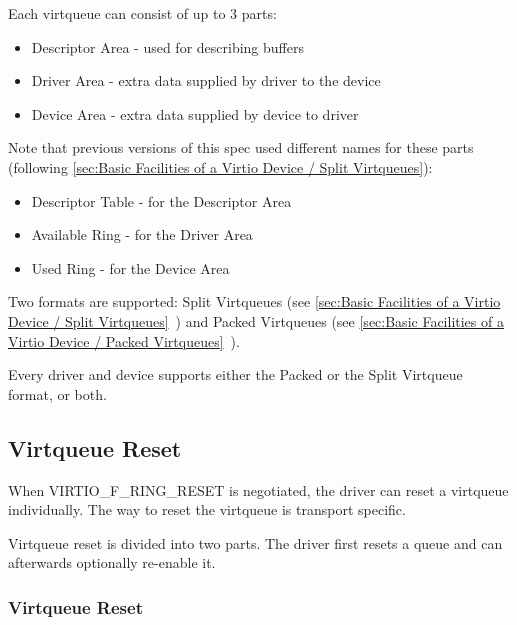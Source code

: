 Each virtqueue can consist of up to 3 parts:
\begin{itemize}
\item Descriptor Area - used for describing buffers
\item Driver Area - extra data supplied by driver to the device
\item Device Area - extra data supplied by device to driver
\end{itemize}

\begin{note}
Note that previous versions of this spec used different names for
these parts (following \ref{sec:Basic Facilities of a Virtio Device / Split Virtqueues}):
\begin{itemize}
\item Descriptor Table - for the Descriptor Area
\item Available Ring - for the Driver Area
\item Used Ring - for the Device Area
\end{itemize}

\end{note}

Two formats are supported: Split Virtqueues (see \ref{sec:Basic
Facilities of a Virtio Device / Split
Virtqueues}~) and Packed Virtqueues (see \ref{sec:Basic
Facilities of a Virtio Device / Packed
Virtqueues}~).

Every driver and device supports either the Packed or the Split
Virtqueue format, or both.

\subsection{Virtqueue Reset}\label{sec:Basic Facilities of a Virtio Device / Virtqueues / Virtqueue Reset}

When VIRTIO_F_RING_RESET is negotiated, the driver can reset a virtqueue
individually. The way to reset the virtqueue is transport specific.

Virtqueue reset is divided into two parts. The driver first resets a queue and
can afterwards optionally re-enable it.

\subsubsection{Virtqueue Reset}\label{sec:Basic Facilities of a Virtio Device / Virtqueues / Virtqueue Reset / Virtqueue Reset}


